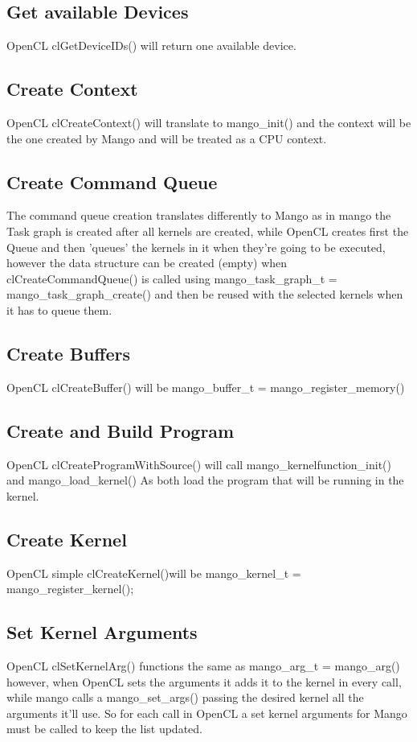 \documentclass[a4paper]{article}
\begin{document}
\subsection{Get available Devices}
OpenCL \ttfamily  clGetDeviceIDs() \rmfamily will return one available device.
\subsection{Create Context}
OpenCL \ttfamily clCreateContext() \rmfamily will translate to \ttfamily mango\_init() \rmfamily and the context will be the one created by Mango and will be treated as a CPU context.
\subsection{Create Command Queue}
The command queue creation translates differently to Mango as in mango the Task graph is created after all kernels are created, while OpenCL creates first the Queue and then 'queues' the kernels in it when they're going to be executed, however the data structure can be created (empty) when  \ttfamily clCreateCommandQueue() \rmfamily is called using 
\ttfamily mango\_task\_graph\_t = mango\_task\_graph\_create() \rmfamily and then be reused with the selected kernels when it has to queue them.
\subsection{Create Buffers}
OpenCL \ttfamily clCreateBuffer() \rmfamily will be \ttfamily mango\_buffer\_t = mango\_register\_memory() \rmfamily
\subsection{Create and Build Program}
OpenCL \ttfamily clCreateProgramWithSource() \rmfamily will call 
\ttfamily mango\_kernelfunction\_init() \rmfamily and \ttfamily mango\_load\_kernel() \rmfamily
As both load the program that will be running in the kernel.
\subsection{Create Kernel}
OpenCL simple \ttfamily clCreateKernel()\rmfamily will be \ttfamily mango\_kernel\_t = mango\_register\_kernel();  \rmfamily
\subsection{Set Kernel Arguments}
OpenCL \ttfamily clSetKernelArg() \rmfamily functions the same as \ttfamily mango\_arg\_t = mango\_arg() \rmfamily however, when OpenCL sets the arguments it adds it to the kernel in every call, while mango calls a \ttfamily mango\_set\_args() \rmfamily passing the desired kernel all the arguments it'll use. So for each call in OpenCL a set kernel arguments for Mango must be called to keep the list updated.
\end{document}
